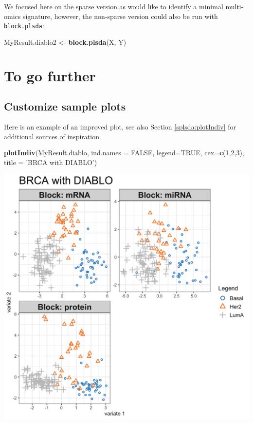 \documentclass[]{book}
\newenvironment{Shaded}{\begin{snugshade}}{\end{snugshade}}
\newcommand{\DataTypeTok}[1]{\textcolor[rgb]{0.13,0.29,0.53}{#1}}
\newcommand{\DecValTok}[1]{\textcolor[rgb]{0.00,0.00,0.81}{#1}}
\newcommand{\KeywordTok}[1]{\textcolor[rgb]{0.13,0.29,0.53}{\textbf{#1}}}
\newcommand{\NormalTok}[1]{#1}
\newcommand{\OtherTok}[1]{\textcolor[rgb]{0.56,0.35,0.01}{#1}}
\newcommand{\StringTok}[1]{\textcolor[rgb]{0.31,0.60,0.02}{#1}}
\begin{document}
We focused here on the sparse version as would like to identify a minimal multi-omics signature, however, the non-sparse version could also be run with \texttt{block.plsda}:

\begin{Shaded}
\begin{Highlighting}[]
\NormalTok{MyResult.diablo2 <-}\StringTok{ }\KeywordTok{block.plsda}\NormalTok{(X, Y)}
\end{Highlighting}
\end{Shaded}

\hypertarget{to-go-further-1}{%
\section{To go further}\label{to-go-further-1}}

\hypertarget{diablo:plotIndiv}{%
\subsection{Customize sample plots}\label{diablo:plotIndiv}}

Here is an example of an improved plot, see also Section \ref{splsda:plotIndiv} for additional sources of inspiration.

\begin{Shaded}
\begin{Highlighting}[]
\KeywordTok{plotIndiv}\NormalTok{(MyResult.diablo, }
          \DataTypeTok{ind.names =} \OtherTok{FALSE}\NormalTok{, }
          \DataTypeTok{legend=}\OtherTok{TRUE}\NormalTok{, }\DataTypeTok{cex=}\KeywordTok{c}\NormalTok{(}\DecValTok{1}\NormalTok{,}\DecValTok{2}\NormalTok{,}\DecValTok{3}\NormalTok{),}
          \DataTypeTok{title =} \StringTok{'BRCA with DIABLO'}\NormalTok{)}
\end{Highlighting}
\end{Shaded}

\begin{center}\includegraphics[width=0.75\linewidth,]{Figures/06-diablo-plotIndiv-1} \end{center}
\end{document}
